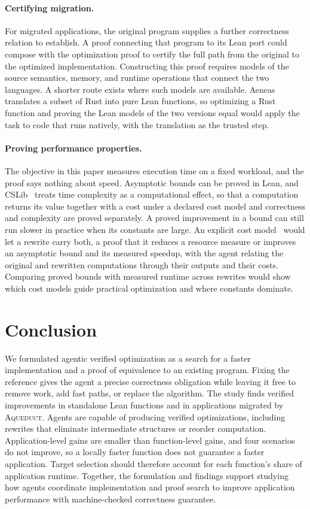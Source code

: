 \documentclass{article}
\newcommand{\aqueduct}{\textsc{Aqueduct}\xspace}
\begin{document}
\paragraph{Certifying migration.}
For migrated applications, the original program supplies a further correctness relation to establish.
A proof connecting that program to its Lean port could compose with the optimization proof to certify the full path from the original to the optimized implementation.
Constructing this proof requires models of the source semantics, memory, and runtime operations that connect the two languages.
A shorter route exists where such models are available.
Aeneas~\citep{ho2022aeneas} translates a subset of Rust into pure Lean functions, so optimizing a Rust function and proving the Lean models of the two versions equal would apply the task to code that runs natively, with the translation as the trusted step.

\paragraph{Proving performance properties.}
The objective in this paper measures execution time on a fixed workload, and the proof says nothing about speed.
Asymptotic bounds can be proved in Lean, and CSLib~\citep{barrett2026cslib} treats time complexity as a computational effect, so that a computation returns its value together with a cost under a declared cost model and correctness and complexity are proved separately.
A proved improvement in a bound can still run slower in practice when its constants are large.
An explicit cost model~\citep{shyamsunder2026formal} would let a rewrite carry both, a proof that it reduces a resource measure or improves an asymptotic bound and its measured speedup, with the agent relating the original and rewritten computations through their outputs and their costs.
Comparing proved bounds with measured runtime across rewrites would show which cost models guide practical optimization and where constants dominate.

\section{Conclusion}
\label{sec:conclusion}

We formulated agentic verified optimization as a search for a faster implementation and a proof of equivalence to an existing program.
Fixing the reference gives the agent a precise correctness obligation while leaving it free to remove work, add fast paths, or replace the algorithm.
The study finds verified improvements in standalone Lean functions and in applications migrated by \aqueduct{}.
Agents are capable of producing verified optimizations, including rewrites that eliminate intermediate structures or reorder computation.
Application-level gains are smaller than function-level gains, and four scenarios do not improve, so a locally faster function does not guarantee a faster application.
Target selection should therefore account for each function's share of application runtime.
Together, the formulation and findings support studying how agents coordinate implementation and proof search to improve application performance with machine-checked correctness guarantee.



\clearpage
\appendix

\end{document}
